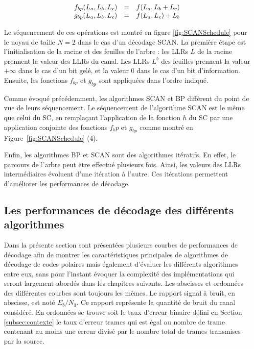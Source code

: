     \begin{eqnarray}
      \begin{array}{l c l}
        f_{bp}(L_a,L_b,L_c) & = & f(L_a, L_b  + L_c) \\
        g_{bp}(L_a,L_b,L_c) & = & f(L_a, L_c) + L_b
      \end{array}
      \label{eq:bp}
    \end{eqnarray}

Le séquencement de ces opérations est montré en figure \ref{fig:SCANSchedule} pour le noyau de taille $N=2$ dans le cas d'un décodage SCAN. La première étape est l'initialisation de la racine et des feuilles de l'arbre : les LLRs $L$ de la racine prennent la valeur des LLRs du canal. Les LLRs $L^b$ des feuilles prennent la valeur $+\infty$ dans le cas d'un bit gelé, et la valeur $0$ dans le cas d'un bit d'information. Ensuite, les fonctions $f_{bp}$ et $g_{bp}$ sont appliquées dans l'ordre indiqué.

Comme évoqué précédemment, les algorithmes SCAN et BP diffèrent du point de vue de leurs séquencement. Le séquencement de l'algorithme SCAN est le même que celui du SC, en remplaçant l'application de la fonction $h$ du SC par une application conjointe des fonctions ${f_bp}$ et $g_{bp}$ comme montré en Figure~\ref{fig:SCANSchedule} (4).

Enfin, les algorithmes BP et SCAN sont des algorithmes itératifs. En effet, le parcours de l'arbre peut être effectué plusieurs fois. Ainsi, les valeurs des LLRs intermédiaires évoluent d'une itération à l'autre. Ces itérations permettent d'améliorer les performances de décodage.

\subsection{Les performances de décodage des différents algorithmes}

Dans la présente section sont présentées plusieurs courbes de performances de décodage afin de montrer les caractéristiques principales de algorithmes de décodage de codes polaires mais également d'évaluer les différents algorithmes entre eux, sans pour l'instant évoquer la complexité des implémentations qui seront largement abordés dans les chapitres suivants. Les abscisses et ordonnées des différentes courbes sont toujours les mêmes. Le rapport signal à bruit, en abscisse, est noté $E_b/N_0$. Ce rapport représente la quantité de bruit du canal considéré. En ordonnées se trouve soit le taux d'erreur binaire défini en Section \ref{subsec:contexte} le taux d'erreur trames qui est égal au nombre de trame contenant au moins une erreur divisé par le nombre total de trames transmises par la source.

